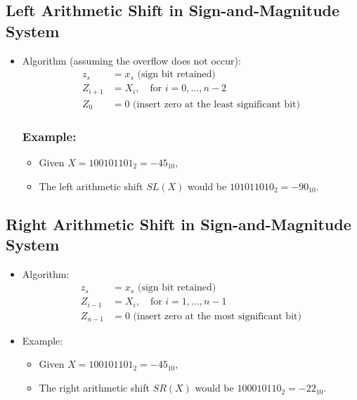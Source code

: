\documentclass[12pt,openany]{book}
\begin{document}
	\subsection{Left Arithmetic Shift in Sign-and-Magnitude System}
	
	\begin{itemize}
		\item[] Algorithm (assuming the overflow does not occur):
			  \begin{align*}
				  z_s     & = x_s \text{ (sign bit retained)}                      \\
				  Z_{i+1} & = X_i, \quad \text{for } i = 0, \ldots, n-2            \\
				  Z_0     & = 0 \text{ (insert zero at the least significant bit)} 
			  \end{align*}
			  \subsubsection*{Example:}
			  \begin{itemize}
				  \item[] Given \( X = 100101101_2 = -45_{10} \),
				  \item[] The left arithmetic shift \( SL(X) \) would be \( 101011010_2 = -90_{10} \).
			  \end{itemize}
	\end{itemize}
	
	\subsection{Right Arithmetic Shift in Sign-and-Magnitude System}
	
	\begin{itemize}
		\item[] Algorithm:
			  \begin{align*}
				  z_s     & = x_s \text{ (sign bit retained)}                     \\
				  Z_{i-1} & = X_i, \quad \text{for } i = 1, \ldots, n - 1         \\
				  Z_{n-1} & = 0 \text{ (insert zero at the most significant bit)} 
			  \end{align*}
		\item[] Example:
			  \begin{itemize}
				  \item[] Given \( X = 100101101_2 = -45_{10} \),
				  \item[] The right arithmetic shift \( SR(X) \) would be \( 100010110_2 = -22_{10} \).
			  \end{itemize}
	\end{itemize}
	
\end{document}
